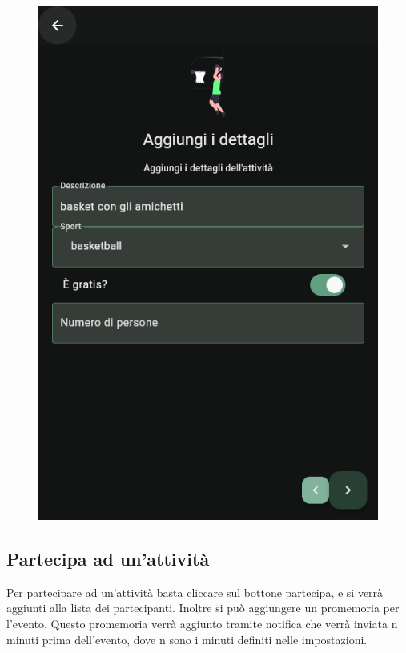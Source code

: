 \documentclass[a4paper,12pt]{article}
\begin{document}
\begin{figure}[H]
\begin{minipage}{0.32\textwidth}
        \includegraphics[width=1\linewidth]{img/new_desc.png}
    \end{minipage}
\end{figure}

\subsection{Partecipa ad un'attività}

Per partecipare ad un'attività basta cliccare sul bottone partecipa, e si verrà aggiunti alla lista dei partecipanti. Inoltre si può aggiungere un promemoria per l'evento.
Questo promemoria verrà aggiunto tramite notifica che verrà inviata \textsf{n} minuti prima dell'evento, dove \textsf{n} sono i minuti definiti nelle impostazioni.
\end{document}
